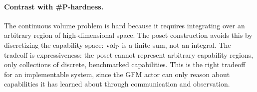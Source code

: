 \paragraph{Contrast with \#P-hardness.} The continuous volume problem is hard
because it requires integrating over an arbitrary region of high-dimensional
space. The poset construction avoids this by discretizing the capability
space: ${\operatorname{vol}_{\mathrm{P}}}$ is a finite sum, not an integral. The tradeoff is
expressiveness: the poset cannot represent arbitrary capability regions, only
collections of discrete, benchmarked capabilities. This is the right tradeoff
for an implementable system, since the GFM actor can only reason about
capabilities it has learned about through communication and observation.
